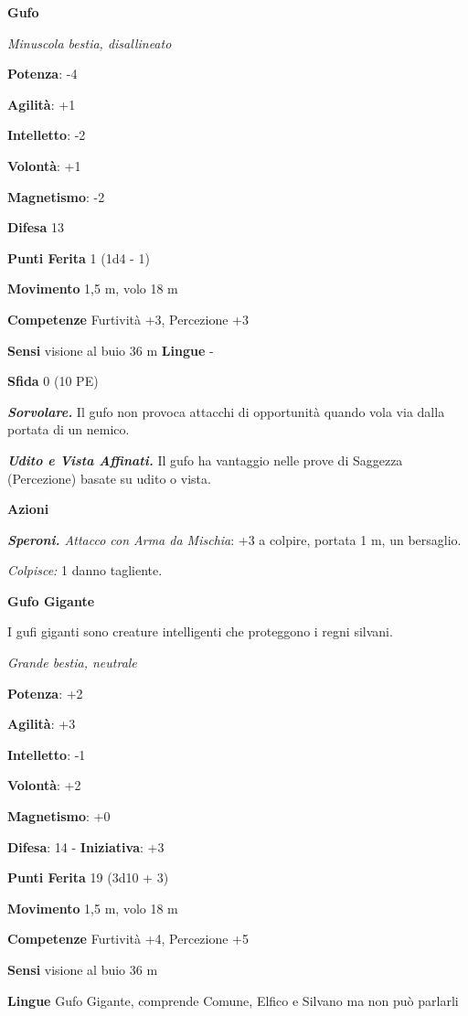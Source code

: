 \begin{multicols}{2}
\textbf{Gufo}

\emph{Minuscola bestia, disallineato}

\textbf{Potenza}: -4

\textbf{Agilità}: +1

\textbf{Intelletto}: -2

\textbf{Volontà}: +1

\textbf{Magnetismo}: -2

\textbf{Difesa} 13

\textbf{Punti Ferita} 1 (1d4 - 1)

\textbf{Movimento} 1,5 m, volo 18 m

\textbf{Competenze} Furtività +3, Percezione +3

\textbf{Sensi} visione al buio 36 m
\textbf{Lingue} -

\textbf{Sfida} 0 (10 PE)\smallskip

\emph{\textbf{Sorvolare.}} Il gufo non provoca attacchi di opportunità
quando vola via dalla portata di un nemico.

\emph{\textbf{Udito e Vista Affinati.}} Il gufo ha vantaggio nelle prove
di Saggezza (Percezione) basate su udito o vista.

\smallskip\textbf{Azioni}

\emph{\textbf{Speroni.} Attacco con Arma da Mischia}: +3 a colpire,
portata 1 m, un bersaglio.

\emph{Colpisce:} 1 danno tagliente.

\textbf{Gufo Gigante}

I gufi giganti sono creature intelligenti che proteggono i regni
silvani.

\emph{Grande bestia, neutrale}

\textbf{Potenza}: +2

\textbf{Agilità}: +3

\textbf{Intelletto}: -1

\textbf{Volontà}: +2

\textbf{Magnetismo}: +0

\textbf{Difesa}: 14 - \textbf{Iniziativa}: +3

\textbf{Punti Ferita} 19 (3d10 + 3)

\textbf{Movimento} 1,5 m, volo 18 m

\textbf{Competenze} Furtività +4, Percezione +5

\textbf{Sensi} visione al buio 36 m

\textbf{Lingue} Gufo Gigante, comprende Comune, Elfico e Silvano ma non
può parlarli


\end{multicols}
